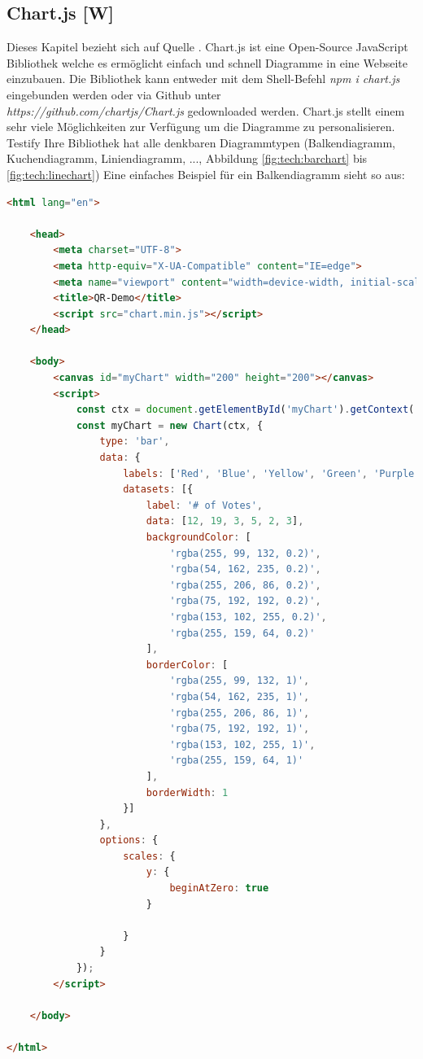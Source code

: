 \subsection{Chart.js [W]}  \label{ChartJs}
Dieses Kapitel bezieht sich auf Quelle \cite{chartJs}.
Chart.js ist eine Open-Source JavaScript Bibliothek welche es ermöglicht einfach und schnell Diagramme
in eine Webseite einzubauen. Die Bibliothek kann entweder mit dem Shell-Befehl \textit{npm i chart.js} eingebunden werden oder via Github unter \\
\textit{https://github.com/chartjs/Chart.js} gedownloaded werden. Chart.js stellt einem sehr
viele Möglichkeiten zur Verfügung um die Diagramme zu personalisieren.
Testify
Ihre Bibliothek hat alle denkbaren Diagrammtypen (Balkendiagramm, Kuchendiagramm, Liniendiagramm, ..., Abbildung \ref{fig:tech:barchart} bis \ref{fig:tech:linechart})
Eine einfaches Beispiel für ein Balkendiagramm sieht so aus:
\begin{lstlisting}[language=html,caption=Balkendiagramm HTML Code,label=lst:tech:gaussianBlur]
<html lang="en">

    <head>
        <meta charset="UTF-8">
        <meta http-equiv="X-UA-Compatible" content="IE=edge">
        <meta name="viewport" content="width=device-width, initial-scale=1.0">
        <title>QR-Demo</title>
        <script src="chart.min.js"></script>
    </head>

    <body>
        <canvas id="myChart" width="200" height="200"></canvas>
        <script>
            const ctx = document.getElementById('myChart').getContext('2d');
            const myChart = new Chart(ctx, {
                type: 'bar',
                data: {
                    labels: ['Red', 'Blue', 'Yellow', 'Green', 'Purple', 'Orange'],
                    datasets: [{
                        label: '# of Votes',
                        data: [12, 19, 3, 5, 2, 3],
                        backgroundColor: [
                            'rgba(255, 99, 132, 0.2)',
                            'rgba(54, 162, 235, 0.2)',
                            'rgba(255, 206, 86, 0.2)',
                            'rgba(75, 192, 192, 0.2)',
                            'rgba(153, 102, 255, 0.2)',
                            'rgba(255, 159, 64, 0.2)'
                        ],
                        borderColor: [
                            'rgba(255, 99, 132, 1)',
                            'rgba(54, 162, 235, 1)',
                            'rgba(255, 206, 86, 1)',
                            'rgba(75, 192, 192, 1)',
                            'rgba(153, 102, 255, 1)',
                            'rgba(255, 159, 64, 1)'
                        ],
                        borderWidth: 1
                    }]
                },
                options: {
                    scales: {
                        y: {
                            beginAtZero: true
                        }
                        
                    }
                }
            });
        </script>

    </body>

</html>
\end{lstlisting}
